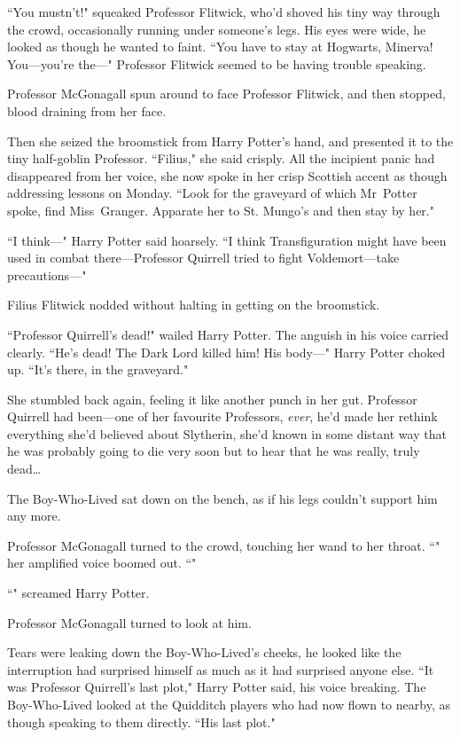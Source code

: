 ``You mustn't!" squeaked Professor Flitwick, who'd shoved his tiny way through the crowd, occasionally running under someone's legs. His eyes were wide, he looked as though he wanted to faint. ``You have to stay at Hogwarts, Minerva! You—you're the—" Professor Flitwick seemed to be having trouble speaking.

Professor McGonagall spun around to face Professor Flitwick, and then stopped, blood draining from her face.

Then she seized the broomstick from Harry Potter's hand, and presented it to the tiny half-goblin Professor. ``Filius," she said crisply. All the incipient panic had disappeared from her voice, she now spoke in her crisp Scottish accent as though addressing lessons on Monday. ``Look for the graveyard of which Mr~Potter spoke, find Miss~Granger. Apparate her to St. Mungo's and then stay by her."

``I think—" Harry Potter said hoarsely. ``I think Transfiguration might have been used in combat there—Professor Quirrell tried to fight Voldemort—take precautions—"

Filius Flitwick nodded without halting in getting on the broomstick.

``Professor Quirrell's dead!" wailed Harry Potter. The anguish in his voice carried clearly. ``He's dead! The Dark Lord killed him! His body—" Harry Potter choked up. ``It's there, in the graveyard."

She stumbled back again, feeling it like another punch in her gut. Professor Quirrell had been—one of her favourite Professors, \emph{ever}, he'd made her rethink everything she'd believed about Slytherin, she'd known in some distant way that he was probably going to die very soon but to hear that he was really, truly dead…

The Boy-Who-Lived sat down on the bench, as if his legs couldn't support him any more.

Professor McGonagall turned to the crowd, touching her wand to her throat. ``" her amplified voice boomed out. ``"

``" screamed Harry Potter.

Professor McGonagall turned to look at him.

Tears were leaking down the Boy-Who-Lived's cheeks, he looked like the interruption had surprised himself as much as it had surprised anyone else. ``It was Professor Quirrell's last plot," Harry Potter said, his voice breaking. The Boy-Who-Lived looked at the Quidditch players who had now flown to nearby, as though speaking to them directly. ``His last plot."

